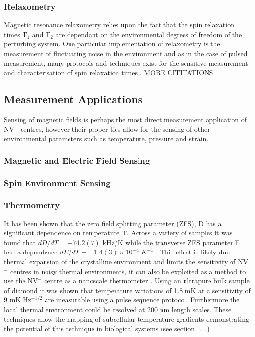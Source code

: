 \documentclass[10pt]{article}
\begin{document}
\begin{multicols}{2}
\subsubsection{Relaxometry}
Magnetic resonance relaxometry relies upon the fact that the spin relaxation times T$_1$ and T$_2$ are dependant on the environmental degrees of freedom of the perturbing system. One particular implementation of relaxometry is the measurement of fluctuating noise in the environment and as in the case of pulsed measurement, many protocols and techniques exist for the sensitive measurement and characterisation of spin relaxation times \cite{steinert2013magnetic}. MORE CITITATIONS

\subsection{Measurement Applications}
Sensing of magnetic fields is perhaps the most direct measurement application of NV$^-$ centres, however their proper-ties allow for the sensing of other environmental parameters such as temperature, pressure and strain. 

\subsubsection{Magnetic and Electric Field Sensing}
\subsubsection{Spin Environment Sensing}


\subsubsection{Thermometry} 
It has been shown \cite{acosta2010temperature} that the zero field splitting parameter (ZFS), D has a significant dependence on temperature T. Across a variety of samples it was found that $dD/dT = -74.2(7)$ kHz/K while the transverse ZFS parameter E had a dependence $dE/dT = -1.4(3)\times10^{-4}$ $K^{-1}$ \cite{acosta2010temperature}. This effect is likely due thermal expansion of the crystalline environment and limits the sensitivity of NV$^-$ centres in noisy thermal environments, it can also be exploited as a method to use the NV$^-$ centre as a nanoscale thermometer \cite{toyli2013fluorescence,neumann2013high,kucsko2013nanometre}. Using an ultrapure bulk sample of diamond it was shown \cite{kucsko2013nanometre} that temperature variations of 1.8 mK at a sensitivity of 9 mK Hz$^{-1/2}$ are measurable using a pulse sequence protocol. Furthermore the local thermal environment could be resolved at 200 nm length scales. These techniques allow the mapping of subcellular temperature gradients \cite{kucsko2013nanometre} demonstrating the potential of this technique in biological systems (see section .....) 


\end{multicols}
\end{document}

